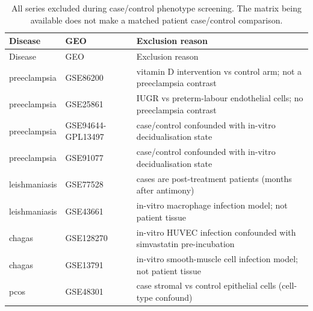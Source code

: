 \begin{longtable}{llp{8.3cm}}
\caption{All series excluded during case/control phenotype screening. The matrix being available does not make a matched patient case/control comparison.}\\
\hline Disease & GEO & Exclusion reason\\\hline\endfirsthead
\hline Disease & GEO & Exclusion reason\\\hline\endhead
preeclampsia & GSE86200 & vitamin D intervention vs control arm; not a preeclampsia contrast\\
preeclampsia & GSE25861 & IUGR vs preterm-labour endothelial cells; no preeclampsia contrast\\
preeclampsia & GSE94644-GPL13497 & case/control confounded with in-vitro decidualisation state\\
preeclampsia & GSE91077 & case/control confounded with in-vitro decidualisation state\\
leishmaniasis & GSE77528 & cases are post-treatment patients (months after antimony)\\
leishmaniasis & GSE43661 & in-vitro macrophage infection model; not patient tissue\\
chagas & GSE128270 & in-vitro HUVEC infection confounded with simvastatin pre-incubation\\
chagas & GSE13791 & in-vitro smooth-muscle cell infection model; not patient tissue\\
pcos & GSE48301 & case stromal vs control epithelial cells (cell-type confound)\\
\hline\end{longtable}
